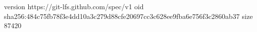 version https://git-lfs.github.com/spec/v1
oid sha256:484c75fb78f3e4dd10a3c279d88cfe20697cc3c628ee9fba6e756f3c2860ab37
size 87420
